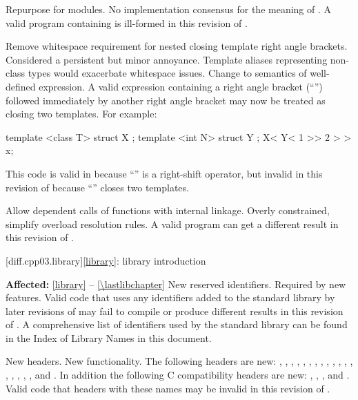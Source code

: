 \change
Repurpose  for modules.
\rationale
No implementation consensus for the \CppIII{} meaning of .
\effect
A valid \CppIII{} program containing  is ill-formed in this
revision of \Cpp{}.

\change
Remove whitespace requirement for nested closing template right angle
brackets.
\rationale
Considered a persistent but minor annoyance. Template aliases
representing non-class types would exacerbate whitespace issues.
\effect
Change to semantics of well-defined expression. A valid \CppIII{} expression
containing a right angle bracket (``\tcode{>}'') followed immediately by
another right angle bracket may now be treated as closing two templates.
For example:
\begin{codeblock}
template <class T> struct X { };
template <int N> struct Y { };
X< Y< 1 >> 2 > > x;
\end{codeblock}
This code is valid in \CppIII{} because ``\tcode{>>}''
is a right-shift operator, but invalid in this revision of \Cpp{} because
``\tcode{>>}'' closes two templates.

\change
Allow dependent calls of functions with internal linkage.
\rationale
Overly constrained, simplify overload resolution rules.
\effect
A valid \CppIII{} program can get a different result in this
revision of \Cpp{}.

[diff.cpp03.library]{\ref{library}: library introduction}

\pnum
\textbf{Affected:} \ref{library} -- \ref{\lastlibchapter}
\change
New reserved identifiers.
\rationale
Required by new features.
\effect
Valid \CppIII{} code that uses any identifiers added to the \Cpp{} standard
library by later revisions of \Cpp{} may fail to compile or produce different
results in this revision of \Cpp{}. A comprehensive list of identifiers used
by the \Cpp{} standard library can be found in the Index of Library Names in this
document.

\change
New headers.
\rationale
New functionality.
\effect
The following \Cpp{} headers are new:
,
,
,
,
,
,
,
,
,
,
,
,
,
,
,
,
,
,
and
.
In addition the following C compatibility headers are new:
,
,
,
and
.
Valid \CppIII{} code that  headers with these names may be
invalid in this revision of \Cpp{}.

